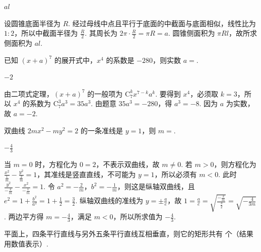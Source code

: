 \documentclass[UTF8,a4paper,oneside,11pt]{ctexbook}
\begin{document}
\begin{answer}
\(al\)
\end{answer}

\begin{solution}
设圆锥底面半径为 \(R\). 经过母线中点且平行于底面的中截面与底面相似，线性比为 \(1:2\)，所以中截面半径为 \(\frac R2\). 其周长为 \(2\pi\cdot\frac R2=\pi R=a\). 圆锥侧面积为 \(\pi Rl\)，故所求侧面积为 \(al\).
\end{solution}

\begin{problem}
已知 \((x+a)^7\) 的展开式中，\(x^4\) 的系数是 \(-280\)，则实数 \(a=\)\fillinblank{}.
\end{problem}

\begin{answer}
\(-2\)
\end{answer}

\begin{solution}
由二项式定理，\((x+a)^7\) 的一般项为 \(\mathrm C_7^k x^{7-k}a^k\). 要得到 \(x^4\)，必须取 \(k=3\)，所以 \(x^4\) 的系数为 \(\mathrm C_7^3a^3=35a^3\). 由题意 \(35a^3=-280\)，得 \(a^3=-8\). 因为 \(a\) 为实数，故 \(a=-2\).
\end{solution}

\begin{problem}
双曲线 \(2mx^2-my^2=2\) 的一条准线是 \(y=1\)，则 \(m=\)\fillinblank{}.
\end{problem}

\begin{answer}
\(-\frac43\)
\end{answer}

\begin{solution}
当 \(m=0\) 时，方程化为 \(0=2\)，不表示双曲线，故 \(m\ne0\). 若 \(m>0\)，则方程化为 \(\frac{x^2}{\frac{1}{m}}-\frac{y^2}{\frac{2}{m}}=1\)，其准线是竖直直线，不可能为 \(y=1\)，所以必须有 \(m<0\). 此时
\(\frac{y^2}{-\frac{2}{m}}-\frac{x^2}{-\frac{1}{m}}=1\). 令 \(a^2=-\frac2m\)，\(b^2=-\frac1m\)，则这是纵轴双曲线，且
\(e^2=1+\frac{b^2}{a^2}=1+\frac12=\frac32\). 纵轴双曲线的准线为 \(y=\pm\frac ae\)，故
\(1=\frac ae=\sqrt{\frac{-\frac{2}{m}}{\frac{3}{2}}}=\sqrt{-\frac4{3m}}\). 两边平方得 \(m=-\frac43\)，满足 \(m<0\)，所以所求值为 \(-\frac43\).
\end{solution}

\begin{problem}
平面上，四条平行直线与另外五条平行直线互相垂直，则它的矩形共有\fillinblank{} 个（结果用数值表示）.
\end{problem}
\end{document}
